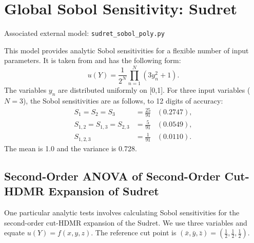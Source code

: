 \section{Global Sobol Sensitivity: Sudret}
Associated external model: \texttt{sudret\_sobol\_poly.py}

This model provides analytic Sobol sensitivities for a flexible number of input parameters.  It is taken from
\cite{sudret2007} and has the following form:
\begin{equation}
  u(Y) = \frac{1}{2^N} \prod_{n=1}^N \left(3y_n^2 + 1\right).
\end{equation}
The variables $y_n$ are distributed uniformly on [0,1].  For three input variables ($N=3$), the Sobol sensitivities are
as follows, to 12 digits of accuracy:
\begin{align}
  S_1 = S_2 = S_3 &= \frac{25}{91}\hspace{10pt} (0.2747), \\
  S_{1,2} = S_{1,3} = S_{2,3} &= \frac{5}{91}\hspace{10pt} (0.0549), \\
  S_{1,2,3} &= \frac{1}{91}\hspace{10pt} (0.0110).
\end{align}
The mean is 1.0 and the variance is 0.728.

\subsection{Second-Order ANOVA of Second-Order Cut-HDMR Expansion of Sudret}
One particular analytic tests involves calculating Sobol sensitivities for the second-order cut-HDMR expansion
of the Sudret.  We use three variables and equate $u(Y) = f(x,y,z)$.  The reference cut point is $(\bar
x,\bar y, \bar z) = (\frac{1}{2},\frac{1}{2},\frac{1}{2})$.

